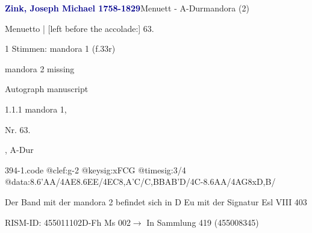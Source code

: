 \documentclass[twocolumn]{book}
\begin{document}
\par \vspace{7pt} \textcolor{darkblue}{\textbf{Zink, Joseph Michael  1758-1829}}\hfillplus{\textbf{[394]}}\newline Menuett - A-Dur\newline mandora (2)
\par \begin{itshape}[f.33r, at left:] Menuetto | [left before the accolade:] 63.\end{itshape} 
\par \textcolor{darkblue}{}  1 Stimmen: mandora 1  (f.33r)\newline \begin{small} mandora 2 missing\end{small} \newline Autograph manuscript
\par 1.1.1  mandora 1, \begin{itshape}Nr. 63.\end{itshape}, A-Dur  
\begin{filecontents*}{394-1.code}
@clef:g-2
@keysig:xFCG
@timesig:3/4
@data:{8.6'AA}/4AE{8.6EE}/4EC{8,A'C}/C,BBA{B'D}/4C-{8.6AA}/4AG{8xD,B}/
\end{filecontents*}
\newline
%
\par Der Band mit der mandora 2 befindet sich in D Eu mit der Signatur Esl VIII 403
\par RISM-ID: 455011102\newline D-Fh  Ms 002\newline $\rightarrow$ In Sammlung 419 (455008345)
      
\end{document}
